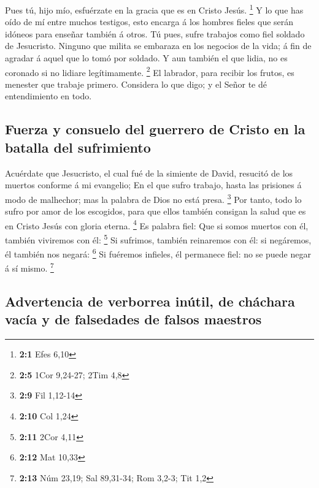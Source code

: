  Pues tú, hijo mío, esfuérzate en la gracia que es en
Cristo Jesús. \footnote{\textbf{2:1} Efes 6,10}  Y lo que
has oído de mí entre muchos testigos, esto encarga á los hombres fieles
que serán idóneos para enseñar también á otros.  Tú pues,
sufre trabajos como fiel soldado de Jesucristo.  Ninguno
que milita se embaraza en los negocios de la vida; á fin de agradar á
aquel que lo tomó por soldado.  Y aun también el que
lidia, no es coronado si no lidiare legítimamente. \footnote{\textbf{2:5}
  1Cor 9,24-27; 2Tim 4,8}  El labrador, para recibir los
frutos, es menester que trabaje primero.  Considera lo que
digo; y el Señor te dé entendimiento en todo.

\hypertarget{fuerza-y-consuelo-del-guerrero-de-cristo-en-la-batalla-del-sufrimiento}{%
\subsection{Fuerza y \hspace{0pt}\hspace{0pt}consuelo del guerrero de
Cristo en la batalla del
sufrimiento}\label{fuerza-y-consuelo-del-guerrero-de-cristo-en-la-batalla-del-sufrimiento}}

 Acuérdate que Jesucristo, el cual fué de la simiente de
David, resucitó de los muertos conforme á mi evangelio; 
En el que sufro trabajo, hasta las prisiones á modo de malhechor; mas la
palabra de Dios no está presa. \footnote{\textbf{2:9} Fil 1,12-14}
 Por tanto, todo lo sufro por amor de los escogidos, para
que ellos también consigan la salud que es en Cristo Jesús con gloria
eterna. \footnote{\textbf{2:10} Col 1,24}  Es palabra
fiel: Que si somos muertos con él, también viviremos con él: \footnote{\textbf{2:11}
  2Cor 4,11}  Si sufrimos, también reinaremos con él: si
negáremos, él también nos negará: \footnote{\textbf{2:12} Mat 10,33}
 Si fuéremos infieles, él permanece fiel: no se puede
negar á sí mismo. \footnote{\textbf{2:13} Núm 23,19; Sal 89,31-34; Rom
  3,2-3; Tit 1,2}

\hypertarget{advertencia-de-verborrea-inuxfatil-de-chuxe1chara-vacuxeda-y-de-falsedades-de-falsos-maestros}{%
\subsection{Advertencia de verborrea inútil, de cháchara vacía y de
falsedades de falsos
maestros}\label{advertencia-de-verborrea-inuxfatil-de-chuxe1chara-vacuxeda-y-de-falsedades-de-falsos-maestros}}

